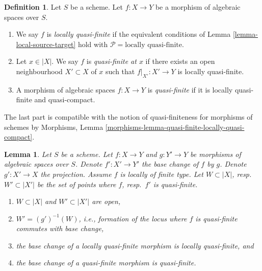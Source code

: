 \documentclass{stacks-project}
\theoremstyle{plain}
\newtheorem{lemma}[subsection]{Lemma}
\theoremstyle{definition}
\newtheorem{definition}[subsection]{Definition}
\theoremstyle{remark}
\numberwithin{equation}{subsection}
\begin{document}
\begin{definition}
\label{definition-locally-quasi-finite}
Let $S$ be a scheme.
Let $f : X \to Y$ be a morphism of algebraic spaces over $S$.
\begin{enumerate}
\item We say $f$ is
{\it locally quasi-finite} if the equivalent conditions of
Lemma \ref{lemma-local-source-target} hold with
$\mathcal{P} = \text{locally quasi-finite}$.
\item Let $x \in |X|$. We say $f$ is {\it quasi-finite at $x$}
if there exists an open neighbourhood $X' \subset X$ of $x$ such
that $f|_{X'} : X' \to Y$ is locally quasi-finite.
\item A morphism of algebraic spaces $f : X \to Y$ is
{\it quasi-finite} if it is locally quasi-finite and quasi-compact.
\end{enumerate}
\end{definition}

\noindent
The last part is compatible with the notion of quasi-finiteness for morphisms
of schemes by
Morphisms, Lemma \ref{morphisms-lemma-quasi-finite-locally-quasi-compact}.

\begin{lemma}
\label{lemma-base-change-quasi-finite-locus}
Let $S$ be a scheme. Let $f : X \to Y$ and $g : Y' \to Y$ be morphisms
of algebraic spaces over $S$. Denote $f' : X' \to Y'$ the base change
of $f$ by $g$. Denote $g' : X' \to X$ the projection.
Assume $f$ is locally of finite type.
Let $W \subset |X|$, resp.\ $W' \subset |X'|$
be the set of points where $f$, resp.\ $f'$ is quasi-finite.
\begin{enumerate}
\item $W \subset |X|$ and $W' \subset |X'|$ are open,
\item $W' = (g')^{-1}(W)$, i.e., formation of the locus where
$f$ is quasi-finite commutes with base change,
\item the base change of a locally quasi-finite morphism is
locally quasi-finite, and
\item the base change of a quasi-finite morphism is quasi-finite.
\end{enumerate}
\end{lemma}
\end{document}
